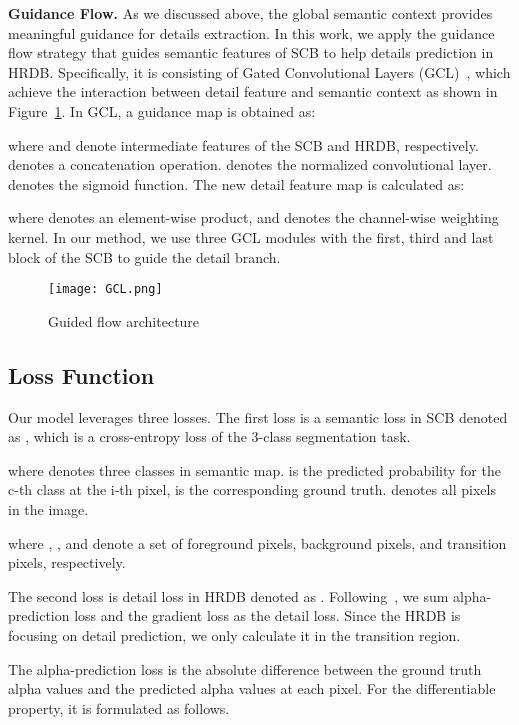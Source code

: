 \documentclass[10pt,twocolumn,letterpaper]{article}
\begin{document}
\textbf{Guidance Flow.}
As we discussed above, the global semantic context provides meaningful guidance for details extraction. In this work, we apply the guidance flow strategy that guides semantic features of SCB to help details prediction in HRDB. Specifically, it is consisting of Gated Convolutional Layers (GCL)~\cite{takikawa2019gated}, which achieve the interaction between detail feature and semantic context as shown in Figure~\ref{fig:gcl}. In GCL, a guidance map  is obtained as:

where  and  denote intermediate features of the SCB and HRDB, respectively.  denotes a concatenation operation.  denotes the normalized  convolutional layer.  denotes the sigmoid function. The new detail feature map  is calculated as:

where  denotes an element-wise product, and  denotes the channel-wise weighting kernel. In our method, we use three GCL modules with the first, third and last block of the SCB to guide the detail branch.

\begin{figure}[t]
\centering
    \texttt{[image: GCL.png]}
    \caption{Guided flow architecture}
    \label{fig:gcl}
\end{figure}


\subsection{Loss Function}

Our model leverages three losses. The first loss is a semantic loss in SCB denoted as , which is a cross-entropy loss of the 3-class segmentation task.


where  denotes three classes in semantic map.  is the predicted probability for the c-th class at the i-th pixel,  is the corresponding ground truth.  denotes all pixels in the image.


where , , and  denote a set of foreground pixels, background pixels, and transition pixels, respectively.

The second loss is detail loss in HRDB denoted as . Following~\cite{xu2017deep, tang2019learning}, we sum alpha-prediction loss  and the gradient loss  as the detail loss. Since the HRDB is focusing on detail prediction, we only calculate it in the transition region.

The alpha-prediction loss is the absolute difference between the ground truth alpha values and the predicted alpha values at each pixel. For the differentiable property, it is formulated as follows.
\end{document}
